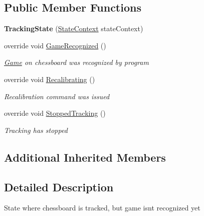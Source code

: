 \subsection*{Public Member Functions}
\begin{DoxyCompactItemize}
\item 
\mbox{\label{class_chess_tracking_1_1_controlling_elements_1_1_program_state_1_1_states_1_1_tracking_state_a1ea919d79237b3eda2ab1627d7388cc5}} 
{\bfseries Tracking\+State} (\mbox{\hyperlink{class_chess_tracking_1_1_controlling_elements_1_1_program_state_1_1_state_context}{State\+Context}} state\+Context)
\item 
override void \mbox{\hyperlink{class_chess_tracking_1_1_controlling_elements_1_1_program_state_1_1_states_1_1_tracking_state_a36f3273295b31a2c88c7ed5c35778460}{Game\+Recognized}} ()
\begin{DoxyCompactList}\small\item\em \mbox{\hyperlink{namespace_chess_tracking_1_1_game}{Game}} on chessboard was recognized by program \end{DoxyCompactList}\item 
override void \mbox{\hyperlink{class_chess_tracking_1_1_controlling_elements_1_1_program_state_1_1_states_1_1_tracking_state_a3a8001d1ae948604124652f58164fa89}{Recalibrating}} ()
\begin{DoxyCompactList}\small\item\em Recalibration command was issued \end{DoxyCompactList}\item 
override void \mbox{\hyperlink{class_chess_tracking_1_1_controlling_elements_1_1_program_state_1_1_states_1_1_tracking_state_ad0e9790393a45fd5508f871864d09c04}{Stopped\+Tracking}} ()
\begin{DoxyCompactList}\small\item\em Tracking has stopped \end{DoxyCompactList}\end{DoxyCompactItemize}
\subsection*{Additional Inherited Members}


\subsection{Detailed Description}
State where chessboard is tracked, but game isn\textquotesingle{}t recognized yet 



